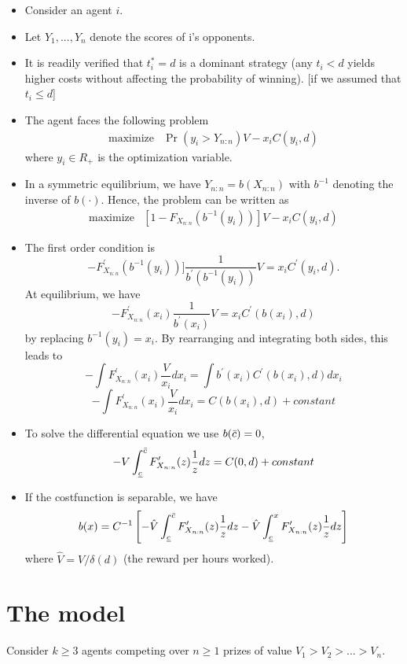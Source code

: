 \documentclass[11pt]{article}
\begin{document}
\begin{itemize}
\item Consider an agent $i$. 
\item Let $Y_1, ..., Y_{n}$ denote the scores of i's opponents.  
\item It is readily verified that $t^*_i = d$ is a dominant strategy (any $t_i<d$ yields higher costs without affecting the probability of winning). [if we assumed that $t_i\leq d$]
\item The agent faces the following problem
\[
    \begin{array}{ll}
        \mbox{maximize} & \Pr(y_i > Y_{n:n}) V - x_i C(y_i, d)
    \end{array}
\]
where $y_i \in R_{+}$ is the optimization variable.
\item In a symmetric equilibrium, we have $Y_{n:n} = b(X_{n:n})$ with $b^{-1}$ denoting the inverse of $b(\cdot)$. Hence, the problem can be written as
\[
    \begin{array}{ll}
        \mbox{maximize} & [1- F_{X_{n:n}}(b^{-1}(y_i))] V - x_i C(y_i, d)
    \end{array}
\]
\item The first order condition is
\[
   - F_{X_{n:n}}^\prime(b^{-1}(y_i))] \frac{1}{b^\prime(b^{-1}(y_i))}V = x_i C^\prime(y_i, d).
\]
At equilibrium, we have
\[
    - F_{X_{n:n}}^\prime(x_i) \frac{1}{b^\prime(x_i)}V  = x_i C^\prime(b(x_i), d) 
\]
by replacing $b^{-1}(y_i)= x_i$. By rearranging and integrating both sides, this leads to
\[
  -\int F_{X_{n:n}}^\prime(x_i) \frac{V}{x_i}d x_i =\int b^\prime(x_i)  C^\prime(b(x_i), d) d x_i
\]
\[
  -\int F_{X_{n:n}}^\prime(x_i) \frac{V}{x_i} d x_i =C(b(x_i), d) + constant
\]
\item To solve the differential equation we use $b(\bar{c}) = 0$, 
\[
  - V \int_{\underline{c}}^{\bar{c}} F_{X_{n:n}}^\prime(z) \frac{1}{z} dz = C(0, d) + constant
\]
\item If the costfunction is separable, we have
\[
  b(x) = C^{-1}\left[ - \hat V \int_{\underline{c}}^{\bar{c}} F_{X_{n:n}}^\prime(z) \frac{1}{z} dz - \hat V \int_{\underline{c}}^{x} F_{X_{n:n}}^\prime(z) \frac{1}{z} dz \right]
\]
where $\hat V =  V / \delta(d)$ (the reward per hours worked). 


\end{itemize}

\clearpage
\section{The model}\label{the-model}
Consider $k\geq 3$ agents competing over $n\geq 1$ prizes of value $V_1 > V_2> ...> V_n$. 
\end{document}
